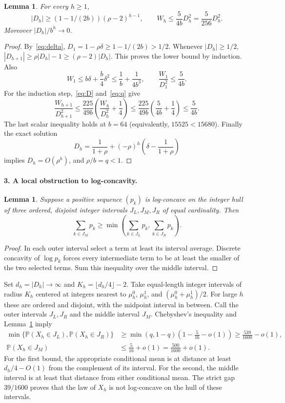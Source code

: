 \documentclass[11pt]{article}
\newtheorem{lemma}[theorem]{Lemma}
\newcommand{\Prob}{\mathbb P}
\begin{document}
\begin{lemma}\label{lem:variance}
For every $h\ge1$,
\[
 |D_h|\ge(1-1/(2b))(\rho-2)^{h-1},\qquad
 W_h\le\frac{5}{4b}D_h^2=\frac5{256}D_h^2.
\]
Moreover $|D_h|/b^h\to0$.
\end{lemma}
\begin{proof}
By~\eqref{eq:delta}, $D_1=1-\rho\delta\ge1-1/(2b)>1/2$.
Whenever $|D_h|\ge1/2$,
$|D_{h+1}|\ge\rho|D_h|-1\ge(\rho-2)|D_h|$.
This proves the lower bound by induction. Also
\[
 W_1\le b\delta+\frac b4\delta^2
 \le\frac1b+\frac1{4b^3},\qquad
 \frac{W_1}{D_1^2}\le\frac5{4b}.
\]
For the induction step,~\eqref{eq:D} and~\eqref{eq:q} give
\[
 \frac{W_{h+1}}{D_{h+1}^2}
 \le\frac{225}{49b}\left(\frac{W_h}{D_h^2}+\frac14\right)
 \le\frac{225}{49b}\left(\frac5{4b}+\frac14\right)
 \le\frac5{4b}.
\]
The last scalar inequality holds at $b=64$ (equivalently, $15525<15680$).
Finally the exact solution
\[
 D_h=\frac1{1+\rho}+(-\rho)^h\left(\delta-\frac1{1+\rho}\right)
\]
implies $D_h=O(\rho^h)$, and $\rho/b=q<1$.
\end{proof}

\paragraph{3. A local obstruction to log-concavity.}
\begin{lemma}\label{lem:valley}
Suppose a positive sequence $(p_k)$ is log-concave on the integer hull of three ordered, disjoint integer intervals $J_L,J_M,J_R$ of equal cardinality. Then
\[
 \sum_{k\in J_M}p_k\ge
 \min\left(\sum_{k\in J_L}p_k,\sum_{k\in J_R}p_k\right).
\]
\end{lemma}
\begin{proof}
In each outer interval select a term at least its interval average.
Discrete concavity of $\log p_k$ forces every intermediate term to be at least the smaller of the two selected terms. Sum this inequality over the middle interval.
\end{proof}

Set $d_h=|D_h|\to\infty$ and $K_h=\lfloor d_h/4\rfloor-2$.
Take equal-length integer intervals of radius $K_h$ centered at integers nearest to $\mu_h^0$, $\mu_h^1$, and $(\mu_h^0+\mu_h^1)/2$.
For large $h$ these are ordered and disjoint, with the midpoint interval in between. Call the outer intervals $J_L,J_R$ and the middle interval $J_M$.
Chebyshev's inequality and Lemma~\ref{lem:variance} imply
\begin{align*}
 \min\{\Prob(X_h\in J_L),\Prob(X_h\in J_R)\}
 &\ge\min(q,1-q)\left(1-\frac5{16}-o(1)\right)
 \ge\frac{539}{1600}-o(1),\\
 \Prob(X_h\in J_M)&\le\frac5{16}+o(1)
 =\frac{500}{1600}+o(1).
\end{align*}
For the first bound, the appropriate conditional mean is at distance at least $d_h/4-O(1)$ from the complement of its interval. For the second, the middle interval is at least that distance from either conditional mean. The strict gap $39/1600$ proves that the law of $X_h$ is not log-concave on the hull of these intervals.
\end{document}
